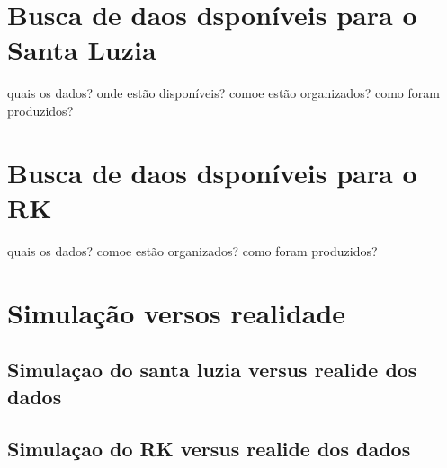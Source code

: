 \section{Busca de daos dsponíveis para o Santa Luzia}

quais os dados? onde estão disponíveis? comoe estão organizados?
como foram produzidos?

\section{Busca de daos dsponíveis para o RK}

quais os dados? comoe estão organizados? como foram produzidos?

\section{Simulação versos realidade}

\subsection{Simulaçao do santa luzia versus realide dos dados}

\subsection{Simulaçao do RK versus realide dos dados}
